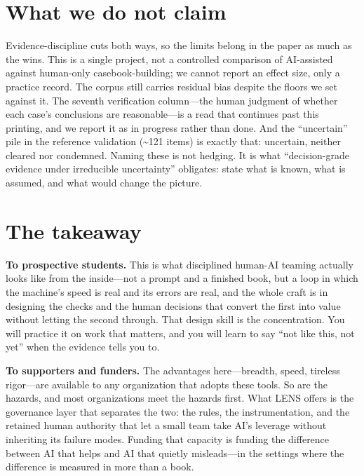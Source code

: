 \documentclass[11pt]{article}
\newcommand{\lead}[1]{{\color{lensaccent}\bfseries #1}}
\begin{document}
\section{What we do not claim}

Evidence-discipline cuts both ways, so the limits belong in the paper as much as the wins. This is a single project, not a controlled comparison of AI-assisted against human-only casebook-building; we cannot report an effect size, only a practice record. The corpus still carries residual bias despite the floors we set against it. The seventh verification column---the human judgment of whether each case's conclusions are reasonable---is a read that continues past this printing, and we report it as in progress rather than done. And the ``uncertain'' pile in the reference validation (\textasciitilde121 items) is exactly that: uncertain, neither cleared nor condemned. Naming these is not hedging. It is what ``decision-grade evidence under irreducible uncertainty'' obligates: state what is known, what is assumed, and what would change the picture.

\section{The takeaway}

\lead{To prospective students.} This is what disciplined human-AI teaming actually looks like from the inside---not a prompt and a finished book, but a loop in which the machine's speed is real and its errors are real, and the whole craft is in designing the checks and the human decisions that convert the first into value without letting the second through. That design skill is the concentration. You will practice it on work that matters, and you will learn to say ``not like this, not yet'' when the evidence tells you to.

\lead{To supporters and funders.} The advantages here---breadth, speed, tireless rigor---are available to any organization that adopts these tools. So are the hazards, and most organizations meet the hazards first. What LENS offers is the governance layer that separates the two: the rules, the instrumentation, and the retained human authority that let a small team take AI's leverage without inheriting its failure modes. Funding that capacity is funding the difference between AI that helps and AI that quietly misleads---in the settings where the difference is measured in more than a book.
\end{document}
